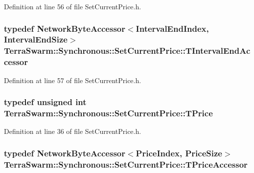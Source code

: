 Definition at line 56 of file Set\-Current\-Price.\-h.

\hypertarget{class_terra_swarm_1_1_synchronous_1_1_set_current_price_ada50db521ec8f4351b11c9e7a55191f6}{
\subsubsection[{T\-Interval\-End\-Accessor}]{\setlength{\rightskip}{0pt plus 5cm}typedef {\bf Network\-Byte\-Accessor}$<${\bf Interval\-End\-Index}, {\bf Interval\-End\-Size}$>$ {\bf Terra\-Swarm\-::\-Synchronous\-::\-Set\-Current\-Price\-::\-T\-Interval\-End\-Accessor}\hspace{0.3cm}{\ttfamily [private]}}}\label{class_terra_swarm_1_1_synchronous_1_1_set_current_price_ada50db521ec8f4351b11c9e7a55191f6}


Definition at line 57 of file Set\-Current\-Price.\-h.

\hypertarget{class_terra_swarm_1_1_synchronous_1_1_set_current_price_a2ed14f2a90070d19a70183bb63e7708e}{
\subsubsection[{T\-Price}]{\setlength{\rightskip}{0pt plus 5cm}typedef unsigned int {\bf Terra\-Swarm\-::\-Synchronous\-::\-Set\-Current\-Price\-::\-T\-Price}}}\label{class_terra_swarm_1_1_synchronous_1_1_set_current_price_a2ed14f2a90070d19a70183bb63e7708e}


Definition at line 36 of file Set\-Current\-Price.\-h.

\hypertarget{class_terra_swarm_1_1_synchronous_1_1_set_current_price_a950c013f39e20f890173e81a716e3b6b}{
\subsubsection[{T\-Price\-Accessor}]{\setlength{\rightskip}{0pt plus 5cm}typedef {\bf Network\-Byte\-Accessor}$<${\bf Price\-Index}, {\bf Price\-Size}$>$ {\bf Terra\-Swarm\-::\-Synchronous\-::\-Set\-Current\-Price\-::\-T\-Price\-Accessor}\hspace{0.3cm}{\ttfamily [private]}}}\label{class_terra_swarm_1_1_synchronous_1_1_set_current_price_a950c013f39e20f890173e81a716e3b6b}


